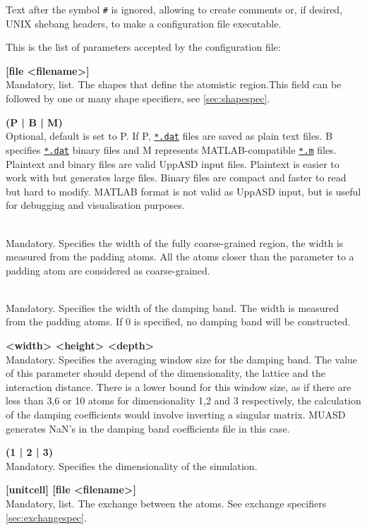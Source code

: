 \documentclass[11pt,fleqn,a4]{book} %
\makeatletter
\newcommand{\litem}[1]{\item[\bfseries#1\index{#1@\texttt{#1}}\label{#1}]}
\newcommand{\rfilename}[1]{\hyperref[#1]{\texttt{#1}}}
\makeatother
\begin{document}
Text after the symbol \verb|#| is ignored, allowing to create comments or, if desired, UNIX shebang headers, to make a configuration file executable.

This is the list of parameters accepted by the configuration file:
\begin{description}[leftmargin=!,labelwidth=\widthof{\bfseries 9999}]
%
\litem{atomistic_shape} {\bf [file <filename>]}  \\Mandatory, list. The shapes that define the atomistic region.This field can be followed by one or many shape specifiers, see \autoref{sec:shapespec}.
\litem{format} {\bf(P | B | M)}   \label{kw:format} \\Optional, default is set to P. If P, \rfilename{*.dat} files are saved as plain text files. B specifies \rfilename{*.dat} binary files and M represents MATLAB-compatible \rfilename{*.m} files. Plaintext and binary files are valid UppASD input files. Plaintext is easier to work with but generates large files. Binary files are compact and faster to read but hard to modify. MATLAB format is not valid as UppASD input, but is useful for debugging and visualisation purposes. 
%  
\litem{coarse_grained_width} {\bf <nonnegative real>}  \\ Mandatory. Specifies the width of the fully coarse-grained region, the width is measured from the padding atoms. All the atoms closer than the parameter to a padding atom are considered as coarse-grained.
%  
\litem{damping_band_width} {\bf <positive real>}   \\Mandatory. Specifies the width of the damping band. The width is measured from the padding atoms. If 0 is specified, no damping band will be constructed.
\litem{damping_band_window_size} {\bf<width> <height> <depth>}  \\ Mandatory. Specifies the averaging window size for the damping band. The value of this parameter should depend of the dimensionality, the lattice and the interaction distance. There is a lower bound for this window size, as if there are less than 3,6 or 10 atoms for dimensionality 1,2 and 3 respectively, the calculation of the damping coefficients would involve inverting a singular matrix. MUASD generates NaN's in the damping band coefficients file in this case.
%  
\litem{dimension} {\bf(1 | 2 | 3)}   \\Mandatory. Specifies the dimensionality of the simulation.
\litem{exchange_atoms} {\bf {[unitcell] [file <filename>]}} \\  Mandatory, list. The exchange between the atoms. See exchange specifiers \autoref{sec:exchangespec}.

\end{description}
\end{document}

